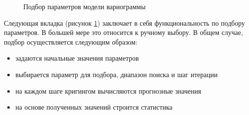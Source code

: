 \begin{figure}[ht]
\caption{Подбор параметров модели вариограммы}
\label{img:mod_fit}
\end{figure}
Следующая вкладка (рисунок \ref{img:mod_fit}) заключает в себя функциональность по подбору параметров. В большей мере это относится к ручному выбору. В общем случае, подбор осуществляется следующим образом:
\begin{itemize}
	\item задаются начальные значения параметров
	\item выбирается параметр для подбора, диапазон поиска и шаг итерации
	\item на каждом шаге кригингом вычисляются прогнозные значения
	\item на основе полученных значений строится статистика
\end{itemize}
